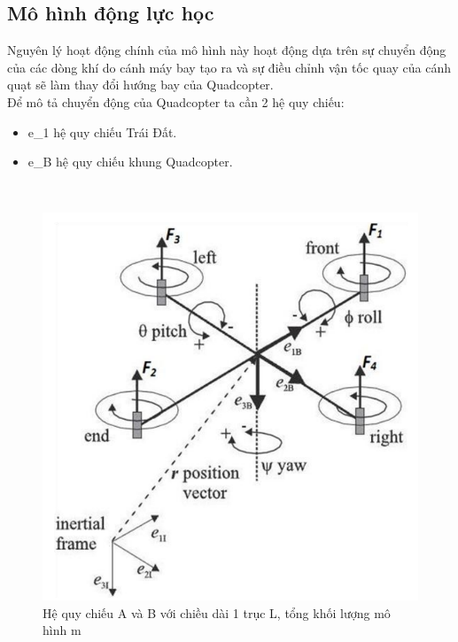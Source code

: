         \subsection{Mô hình động lực học}
        Nguyên lý hoạt động chính của mô hình này hoạt động dựa trên sự chuyển động của các dòng khí do cánh máy bay tạo ra và sự điều chỉnh vận tốc quay của cánh quạt sẽ làm thay đổi hướng bay của Quadcopter.
        \\
        Để mô tả chuyển động của Quadcopter ta cần 2 hệ quy chiếu:
        \begin{itemize}
        \item e_1 hệ quy chiếu Trái Đất.
        \item e_B hệ quy chiếu khung Quadcopter.
        \end{itemize}
        \\
        \begin{figure}[h!]
	        	\begin{center}
	        		\includegraphics[scale=0.8]{images/Cuong-reference.png}
	        		\caption{Hệ quy chiếu A và B với chiều dài 1 trục L, tổng khối lượng mô hình m}
	        	\end{center}
        \end{figure}
